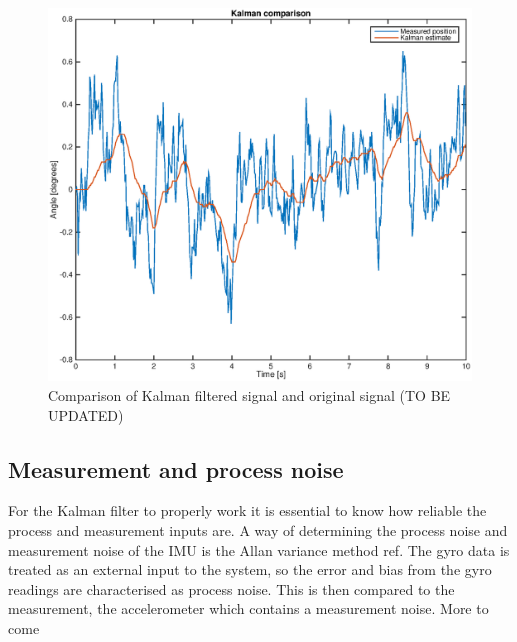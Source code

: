 \documentclass[a4paper,11pt]{kth-mag}
\begin{document}
\begin{figure}[!htb]
\centering
\includegraphics[scale=.7]{Kalmancomparisonplot.eps}
\caption{Comparison of Kalman filtered signal and original signal (TO BE UPDATED)}
\label{fig:Kalman comparison}
\end{figure}



\subsection{Measurement and process noise} \label{chapter:Allan Variance}
For the Kalman filter to properly work it is essential to know how reliable the process and measurement inputs are. A way of determining the process noise and measurement noise of the IMU is the Allan variance method ref.
The gyro data is treated as an external input to the system, so the error and bias from the gyro readings are characterised as process noise. This is then compared to the measurement, the accelerometer which contains a measurement noise.
More to come
\end{document}
